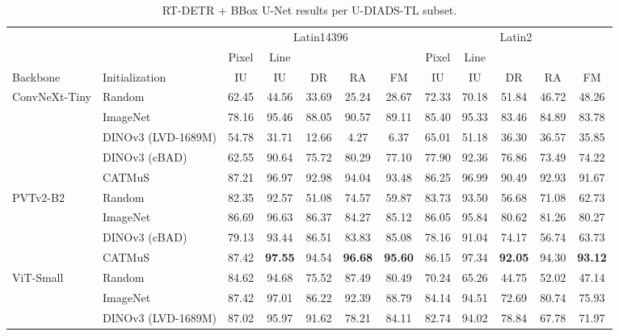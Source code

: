 \begin{table}[htbp]
    \centering
    \scriptsize
    \setlength{\tabcolsep}{1.3pt}
    \renewcommand{\arraystretch}{0.92}
    \caption{RT-DETR + BBox U-Net results per U-DIADS-TL subset.}
    \label{tab:rq1-rtdetr-fm}\label{tab:rq1-rtdetr-udiads-subsets}\label{tab:rq1-rtdetr-udiads-average}
    \begin{tabular*}{\textwidth}{@{\extracolsep{\fill}}ll*{10}{c}@{}}
        \toprule
        & & \multicolumn{5}{c}{Latin14396} & \multicolumn{5}{c}{Latin2} \\
        \cmidrule(lr){3-7}\cmidrule(l){8-12}
        & & Pixel & Line & & & & Pixel & Line & & & \\
        Backbone & Initialization & IU & IU & DR & RA & FM & IU & IU & DR & RA & FM \\
        \midrule
        ConvNeXt-Tiny & Random & 62.45 & 44.56 & 33.69 & 25.24 & 28.67 & 72.33 & 70.18 & 51.84 & 46.72 & 48.26 \\
         & ImageNet & 78.16 & 95.46 & 88.05 & 90.57 & 89.11 & 85.40 & 95.33 & 83.46 & 84.89 & 83.78 \\
         & DINOv3 (LVD-1689M) & 54.78 & 31.71 & 12.66 & 4.27 & 6.37 & 65.01 & 51.18 & 36.30 & 36.57 & 35.85 \\
         & DINOv3 (cBAD) & 62.55 & 90.64 & 75.72 & 80.29 & 77.10 & 77.90 & 92.36 & 76.86 & 73.49 & 74.22 \\
         & CATMuS & 87.21 & 96.97 & 92.98 & 94.04 & 93.48 & 86.25 & 96.99 & 90.49 & 92.93 & 91.67 \\
        \addlinespace[1pt]
        PVTv2-B2 & Random & 82.35 & 92.57 & 51.08 & 74.57 & 59.87 & 83.73 & 93.50 & 56.68 & 71.08 & 62.73 \\
         & ImageNet & 86.69 & 96.63 & 86.37 & 84.27 & 85.12 & 86.05 & 95.84 & 80.62 & 81.26 & 80.27 \\
         & DINOv3 (cBAD) & 79.13 & 93.44 & 86.51 & 83.83 & 85.08 & 78.16 & 91.04 & 74.17 & 56.74 & 63.73 \\
         & CATMuS & 87.42 & \textbf{97.55} & 94.54 & \textbf{96.68} & \textbf{95.60} & 86.15 & 97.34 & \textbf{92.05} & 94.30 & \textbf{93.12} \\
        \addlinespace[1pt]
        ViT-Small & Random & 84.62 & 94.68 & 75.52 & 87.49 & 80.49 & 70.24 & 65.26 & 44.75 & 52.02 & 47.14 \\
         & ImageNet & 87.42 & 97.01 & 86.22 & 92.39 & 88.79 & 84.14 & 94.51 & 72.69 & 80.74 & 75.93 \\
         & DINOv3 (LVD-1689M) & 87.02 & 95.97 & 91.62 & 78.21 & 84.11 & 82.74 & 94.02 & 78.84 & 67.78 & 71.97 \\

\end{tabular*}
\end{table}

